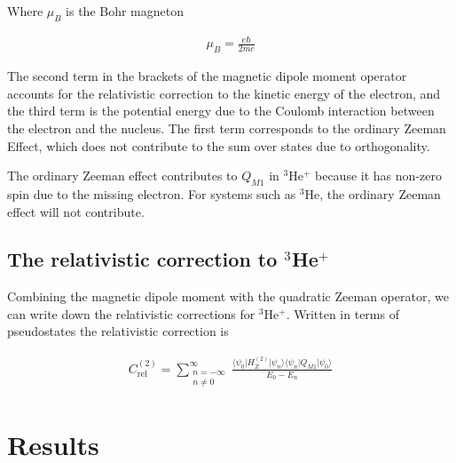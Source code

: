             \noindent Where $\mu_B$ is the Bohr magneton
            
            \begin{align}
                \mu_B = \frac{e \hbar}{2mc}
            \end{align}

            \noindent The second term in the brackets of the magnetic dipole moment operator accounts for the relativistic correction to the kinetic energy of the electron, and the third term is the potential energy due to the Coulomb interaction between the electron and the nucleus. The first term corresponds to the ordinary Zeeman Effect, which does not contribute to the sum over states due to orthogonality.

            The ordinary Zeeman effect contributes to $Q_{M1}$ in $^3$He$^+$ because it has non-zero spin due to the missing electron. For systems such as $^3$He, the ordinary Zeeman effect will not contribute.

        \subsection{The relativistic correction to $^3$He$^+$}\label{sec:Relativistic_Correction}
            Combining the magnetic dipole moment with the quadratic Zeeman operator, we can write down the relativistic
            corrections for $^3$He$^+$. Written in terms of pseudostates the relativistic correction is

            \begin{align}
                C_{\text{rel}}^{(2)} =\sum_{\substack{n = -\infty \\ n \neq 0}}^{\infty}
                \frac{\langle \psi_0 \vert H_Z^{(2)} \vert \psi_n \rangle \langle \psi_n \vert Q_{M1} \vert \psi_0 \rangle}{E_0 - E_n}
            \end{align}


    \section{Results}





